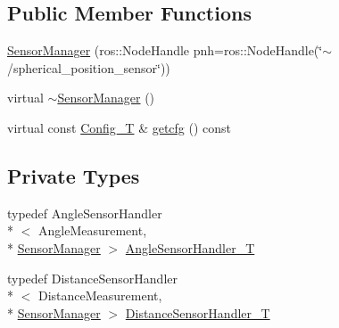\subsection*{Public Member Functions}
\begin{DoxyCompactItemize}
\item 
\hyperlink{classmsf__spherical__position_1_1SensorManager_a0c0be3eb590227d82657b4a5abfcc795}{Sensor\-Manager} (ros\-::\-Node\-Handle pnh=ros\-::\-Node\-Handle(\char`\"{}$\sim$/spherical\-\_\-position\-\_\-sensor\char`\"{}))
\item 
virtual \hyperlink{classmsf__spherical__position_1_1SensorManager_ad6dbf5e4f14ebfba093d407cdd231454}{$\sim$\-Sensor\-Manager} ()
\item 
virtual const \hyperlink{namespacemsf__spherical__position_a48bbe0c42021c86a6ed32ae9c30df686}{Config\-\_\-\-T} \& \hyperlink{classmsf__spherical__position_1_1SensorManager_a1427078aa48b91e31e4e96c7afd75252}{getcfg} () const 
\end{DoxyCompactItemize}
\subsection*{Private Types}
\begin{DoxyCompactItemize}
\item 
typedef Angle\-Sensor\-Handler\\*
$<$ Angle\-Measurement, \\*
\hyperlink{classmsf__spherical__position_1_1SensorManager}{Sensor\-Manager} $>$ \hyperlink{classmsf__spherical__position_1_1SensorManager_ae4c6b1d54308f35a6b14174068a79922}{Angle\-Sensor\-Handler\-\_\-\-T}
\item 
typedef Distance\-Sensor\-Handler\\*
$<$ Distance\-Measurement, \\*
\hyperlink{classmsf__spherical__position_1_1SensorManager}{Sensor\-Manager} $>$ \hyperlink{classmsf__spherical__position_1_1SensorManager_aa3757032c5c9ee975d70be8502956e23}{Distance\-Sensor\-Handler\-\_\-\-T}
\end{DoxyCompactItemize}
